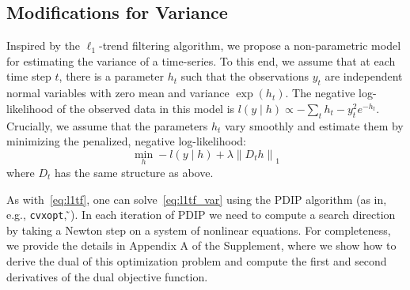 \documentclass[letterpaper]{article} %
\newcommand{\citealp}[1]
{\citeauthor{#1} ̃\citeyear{#1}}
\newcommand{\autoref}{\Cref}
\newcommand{\given}{\;\vert\;}
\newcommand{\norm}[1]{\left\lVert #1 \right\rVert}
\begin{document}

\subsection{Modifications for Variance}
\label{sec:l1tf_var}


Inspired by the $\ell_1$-trend filtering algorithm, we propose a
non-parametric model for estimating the variance of a time-series. To
this end, we assume that at each time step $t$, there is a parameter
$h_t$ such that the observations $y_t$
are independent normal variables with zero mean and variance
$\exp(h_t)$. The negative log-likelihood of the observed data in this
model is $l(y\given h) \propto -\sum_t h_t - y_t^2e^{-h_t}$. Crucially,
we assume that the parameters $h_t$ vary smoothly and estimate them by
minimizing the penalized, negative
log-likelihood:  
\begin{equation}
\min_h -l(y\given h)+\lambda \norm{ D_th }_1
\label{eq:l1tf_var}
\end{equation}
where $D_t$ has the same structure as above.

As with~\eqref{eq:l1tf}, one can solve~\eqref{eq:l1tf_var} using the
PDIP algorithm (as in, e.g.,
\texttt{cvxopt}, \citealp{andersen_cvxopt:_2013}). In each iteration of
PDIP we need to compute a search direction by taking a Newton
step on a system of nonlinear equations. For completeness, we
provide the details in Appendix A of the Supplement, where we show how to
derive the dual of this optimization problem and compute the first and
second derivatives of the dual objective function.  
\end{document}
